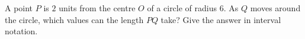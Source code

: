 A point $P$ is $2$ units from the centre $O$ of a circle of radius $6$. As $Q$ moves around the circle, which values can the length $PQ$ take? Give the answer in interval notation.
